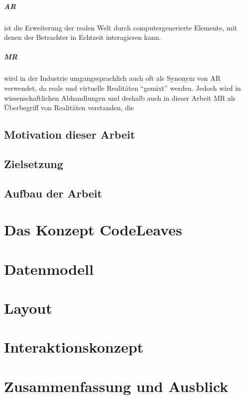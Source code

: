 \paragraph{AR} ist die Erweiterung der realen Welt durch computergenerierte Elemente, mit denen der Betrachter in Echtzeit interagieren kann.

\paragraph{MR} wird in der Industrie umgangssprachlich auch oft als Synonym von AR verwendet, da reale und virtuelle Realitäten "`gemixt"' werden. Jedoch wird in wissenschaftlichen Abhandlungen und deshalb auch in dieser Arbeit MR als Überbegriff von Realitäten verstanden, die

\section{Motivation dieser Arbeit}

\section{Zielsetzung}

\section{Aufbau der Arbeit}

\chapter{Das Konzept CodeLeaves}
\chapter{Datenmodell}
\chapter{Layout}
\chapter{Interaktionskonzept}
\chapter{Zusammenfassung und Ausblick}
